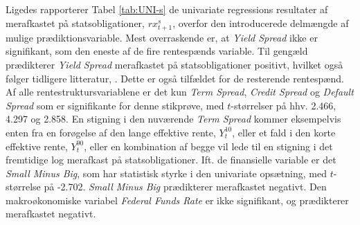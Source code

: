 \documentclass[
  a4paper,
  oneside]{memoir}
\begin{document}
Ligedes rapporterer Tabel \ref{tab:UNI-s} de univariate regressions resultater af merafkastet på statsobligationer, \(rx_{t+1}^s\), overfor den introducerede delmængde af mulige prædiktionsvariable. Mest overraskende er, at \emph{Yield Spread} ikke er signifikant, som den eneste af de fire rentespænds variable. Til gengæld prædikterer \emph{Yield Spread} merafkastet på statsobligationer positivt, hvilket også følger tidligere litteratur, \citep{Fama1987}. Dette er også tilfældet for de resterende rentespænd. Af alle rentestruktursvariablene er det kun \emph{Term Spread}, \emph{Credit Spread} og \emph{Default Spread} som er signifikante for denne stikprøve, med \(t\)-størrelser på hhv. 2.466, 4.297 og 2.858. En stigning i den nuværende \emph{Term Spread} kommer eksempelvis enten fra en forøgelse af den lange effektive rente, \(Y_t^{10}\), eller et fald i den korte effektive rente, \(Y_t^{90}\), eller en kombination af begge vil lede til en stigning i det fremtidige log merafkast på statsobligationer. Ift. de finansielle variable er det \emph{Small Minus Big}, som har statistisk styrke i den univariate opsætning, med \(t\)-størrelse på -2.702. \emph{Small Minus Big} prædikterer merafkastet negativt. Den makroøkonomiske variabel \emph{Federal Funds Rate} er ikke signifikant, og prædikterer merafkastet negativt.
\end{document}
